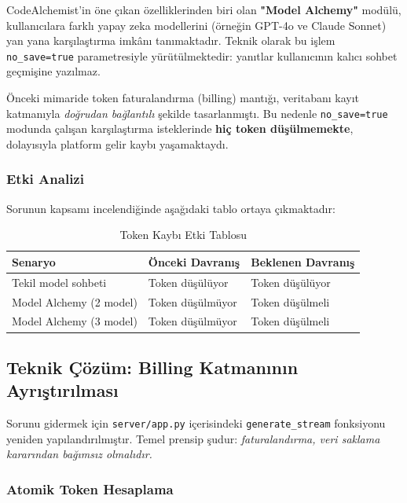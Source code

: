\documentclass[12pt,a4paper]{article}
\begin{document}
CodeAlchemist'in öne çıkan özelliklerinden biri olan \textbf{"Model Alchemy"} modülü, kullanıcılara farklı yapay zeka modellerini (örneğin GPT-4o ve Claude Sonnet) yan yana karşılaştırma imkânı tanımaktadır. Teknik olarak bu işlem \texttt{no\_save=true} parametresiyle yürütülmektedir: yanıtlar kullanıcının kalıcı sohbet geçmişine yazılmaz.

\begin{warnbox}
Önceki mimaride token faturalandırma (billing) mantığı, veritabanı kayıt katmanıyla \emph{doğrudan bağlantılı} şekilde tasarlanmıştı. Bu nedenle \texttt{no\_save=true} modunda çalışan karşılaştırma isteklerinde \textbf{hiç token düşülmemekte}, dolayısıyla platform gelir kaybı yaşamaktaydı.
\end{warnbox}

\subsubsection{Etki Analizi}

Sorunun kapsamı incelendiğinde aşağıdaki tablo ortaya çıkmaktadır:

\begin{table}[H]
\centering
\caption{Token Kaybı Etki Tablosu}
\begin{tabularx}{\textwidth}{@{} l X X @{}}
\toprule
\textbf{Senaryo} & \textbf{Önceki Davranış} & \textbf{Beklenen Davranış} \\
\midrule
Tekil model sohbeti   & Token düşülüyor   & Token düşülüyor \\
Model Alchemy (2 model) & \textcolor{codered}{Token düşülmüyor} & Token düşülmeli \\
Model Alchemy (3 model) & \textcolor{codered}{Token düşülmüyor} & Token düşülmeli \\
\bottomrule
\end{tabularx}
\end{table}

\subsection{Teknik Çözüm: Billing Katmanının Ayrıştırılması}

Sorunu gidermek için \texttt{server/app.py} içerisindeki \texttt{generate\_stream} fonksiyonu yeniden yapılandırılmıştır. Temel prensip şudur: \emph{faturalandırma, veri saklama kararından bağımsız olmalıdır.}

\subsubsection{Atomik Token Hesaplama}
\end{document}
